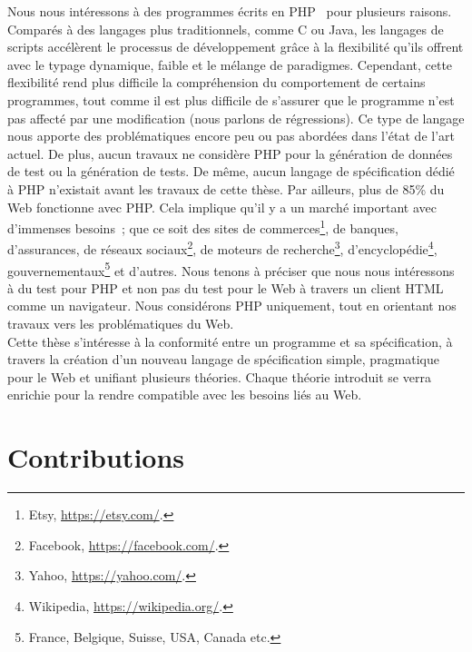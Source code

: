 Nous nous intéressons à des programmes écrits en PHP~ pour plusieurs
raisons. Comparés à des langages plus traditionnels, comme C ou Java, les
langages de scripts accélèrent le processus de développement grâce à la
flexibilité qu'ils offrent avec le typage dynamique, faible et le mélange de
paradigmes. Cependant, cette flexibilité rend plus difficile la compréhension du
comportement de certains programmes, tout comme il est plus difficile de
s'assurer que le programme n'est pas affecté par une modification (nous parlons
de {\strong régressions}). Ce type de langage nous apporte des problématiques
encore peu ou pas abordées dans l'état de l'art actuel. De plus, aucun travaux
ne considère PHP pour la génération de données de test ou la génération de
tests. De même, aucun langage de spécification dédié à PHP n'existait avant les
travaux de cette thèse. Par ailleurs, plus de 85\% du Web fonctionne avec PHP.
Cela implique qu'il y a un marché important avec d'immenses besoins~; que ce
soit des sites de commerces\footnote{Etsy, \url{https://etsy.com/}.}, de
banques, d'assurances, de réseaux sociaux\footnote{Facebook,
\url{https://facebook.com/}.}, de moteurs de recherche\footnote{Yahoo,
\url{https://yahoo.com/}.}, d'encyclopédie\footnote{Wikipedia,
\url{https://wikipedia.org/}.}, gouvernementaux\footnote{France, Belgique,
Suisse, USA, Canada etc.} et d'autres. Nous tenons à préciser que nous nous
intéressons à du test pour PHP et non pas du test pour le Web à travers un
client HTML comme un navigateur. Nous considérons PHP uniquement, tout en
orientant nos travaux vers les problématiques du Web. \\

Cette thèse s'intéresse à la conformité entre un programme et sa spécification,
à travers la création d'un nouveau langage de spécification simple, pragmatique
pour le Web et unifiant plusieurs théories. Chaque théorie introduit se verra
enrichie pour la rendre compatible avec les besoins liés au Web.

\section{Contributions}
\label{section:introduction:contributions}
